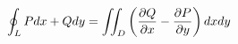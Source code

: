 \documentclass[preview]{standalone}
\begin{document}
\begin{align*}
\special{dvisvgm:raw <g id='unique000'>}\oint_L P dx + Q dy = \iint_D \left( \frac{\partial Q}{\partial x} - \frac{\partial P}{\partial y} \right) dxdy\special{dvisvgm:raw </g>}
\end{align*}
\end{document}
